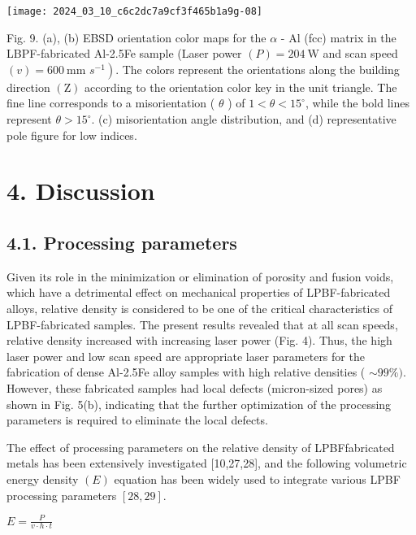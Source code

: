 \documentclass[10pt]{article}
\begin{document}
\texttt{[image: 2024\_03\_10\_c6c2dc7a9cf3f465b1a9g-08]}

Fig. 9. (a), (b) EBSD orientation color maps for the $\alpha$ - $\mathrm{Al}$ (fcc) matrix in the LBPF-fabricated Al-2.5Fe sample (Laser power $(P)=204 \mathrm{~W}$ and scan speed $(v)=600 \mathrm{~mm}$ $\left.s^{-1}\right)$. The colors represent the orientations along the building direction $(\mathrm{Z})$ according to the orientation color key in the unit triangle. The fine line corresponds to a misorientation ( $\theta$ ) of $1<\theta<15^{\circ}$, while the bold lines represent $\theta>15^{\circ}$. (c) misorientation angle distribution, and (d) representative pole figure for low indices.

\section*{4. Discussion}
\subsection*{4.1. Processing parameters}
Given its role in the minimization or elimination of porosity and fusion voids, which have a detrimental effect on mechanical properties of LPBF-fabricated alloys, relative density is considered to be one of the critical characteristics of LPBF-fabricated samples. The present results revealed that at all scan speeds, relative density increased with increasing laser power (Fig. 4). Thus, the high laser power and low scan speed are appropriate laser parameters for the fabrication of dense Al-2.5Fe alloy samples with high relative densities ( $\sim 99 \%)$. However, these fabricated samples had local defects (micron-sized pores) as shown in Fig. 5(b), indicating that the further optimization of the processing parameters is required to eliminate the local defects.

The effect of processing parameters on the relative density of LPBFfabricated metals has been extensively investigated [10,27,28], and the following volumetric energy density $(E)$ equation has been widely used to integrate various LPBF processing parameters $[28,29]$.

$E=\frac{P}{v \cdot h \cdot t}$
\end{document}
